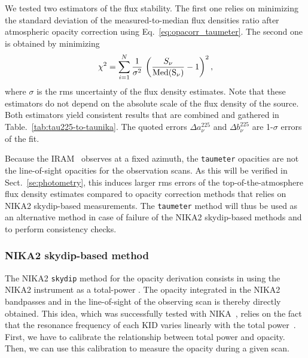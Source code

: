 We tested two estimators of the flux stability. The first one relies
on minimizing the standard deviation of the measured-to-median flux
densities ratio after atmospheric opacity correction using
Eq.~\ref{eq:opacorr_taumeter}. The second one is obtained by minimizing
\begin{equation}
\chi^2 = \sum_{i=1}^{N} \frac{1}{\sigma^2} \, \left( \frac{S_\nu}{\rm{Med}(S_\nu)} -1 \right)^2,  
\end{equation}
where $\sigma$ is the rms uncertainty of the flux density estimates. Note
that these estimators do not depend on
the absolute scale of the flux density of the source. Both estimators
yield consistent results that are combined and gathered in
Table.~\ref{tab:tau225-to-taunika}. The quoted errors
$\Delta a_\nu^{225}$ and $\Delta b_\nu^{225}$ are 1-$\sigma$ errors of
the fit.

Because the IRAM \taumeter\ observes at a fixed azimuth, the
{\tt taumeter} opacities are not the line-of-sight opacities
for the observation scans. As this will be verified in
Sect.~\ref{se:photometry}, this induces larger rms errors of
the top-of-the-atmosphere flux density estimates compared to
opacity correction methods that relies on NIKA2 skydip-based
measurements. The {\tt taumeter} method will thus be used
as an alternative method in case of failure of the NIKA2 skydip-based
methods and to perform consistency checks.


\subsubsection{NIKA2 skydip-based method}
\label{se:skydip-method}

The NIKA2 {\tt skydip} method for the opacity derivation consists in
using the NIKA2 instrument as a total-power \taumeter. {\lp The opacity
integrated in the NIKA2 bandpasses and in the line-of-sight of the
observing scan is thereby directly obtained.} 
This idea,
which was successfully tested with NIKA~\citep{Catalano2014}, relies
on the fact that the resonance frequency of each KID varies linearly
with the total power~\citep{Swenson2010}.
First, we have to calibrate the relationship between total
power and opacity. Then, we can use this calibration to measure the
opacity during a given scan. %


